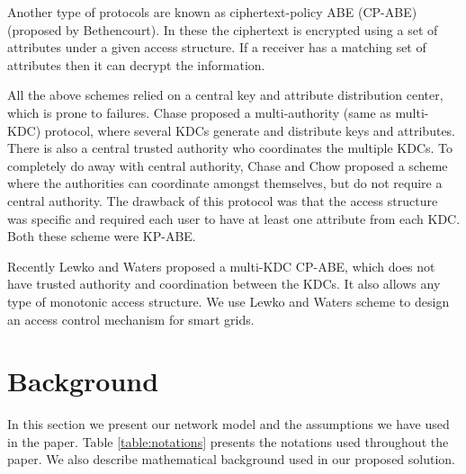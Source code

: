\documentclass[conference]{IEEEtran}[10pt]
\begin{document}
Another type of protocols are known as ciphertext-policy ABE (CP-ABE) \cite{BSW07} (proposed by Bethencourt). 
In these the ciphertext is encrypted using a set of attributes under a given access structure. 
If a receiver has a matching set of attributes then it can decrypt the information. 

All the above schemes relied on a central key and attribute distribution center, which is prone to failures. 
Chase \cite{C07} proposed a multi-authority (same as multi-KDC) protocol, where several KDCs generate and distribute
keys and attributes. There is also a central trusted authority who coordinates the multiple KDCs. 
To completely do away with central authority, Chase and Chow \cite{CC09} proposed a scheme where the authorities can coordinate amongst themselves, 
but do not require a central authority. 
The drawback of this protocol was that the access structure was specific and required each user to have at least one attribute from each KDC. 
Both these scheme were KP-ABE.

Recently Lewko and Waters \cite{LW11} proposed a multi-KDC CP-ABE, which does not have trusted authority and coordination between the KDCs.
It also allows any type of monotonic access structure. 
We use Lewko and Waters scheme to design an access control mechanism for smart grids.  


\section{Background}
\label{sec:prelims}
In this section we present our network model and the assumptions we have used in the paper. 
Table \ref{table:notations} presents the notations used throughout the paper. 
We also describe mathematical background used in our proposed solution.
\end{document}
